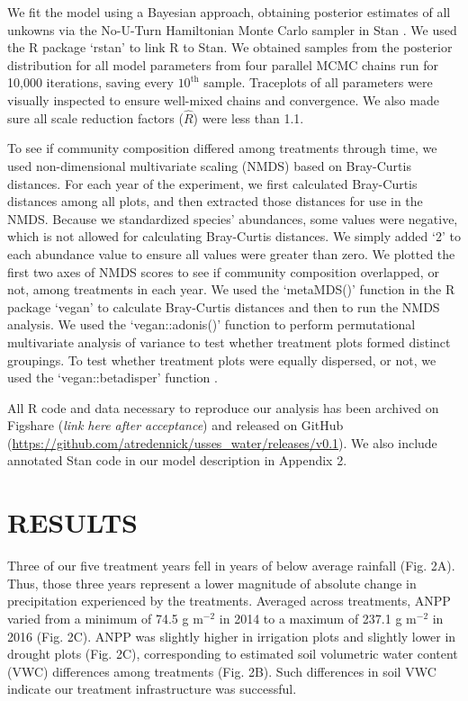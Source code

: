 \documentclass[fleqn,10pt,lineno]{wlpeerj} %
\begin{document}
We fit the model using a Bayesian approach, obtaining posterior
estimates of all unkowns via the No-U-Turn Hamiltonian Monte Carlo
sampler in Stan \citep{stan2016}. We used the R package `rstan'
\citep{rstan2016} to link R \citep{R2016} to Stan. We obtained samples
from the posterior distribution for all model parameters from four
parallel MCMC chains run for 10,000 iterations, saving every
\(10^{\text{th}}\) sample. Traceplots of all parameters were visually
inspected to ensure well-mixed chains and convergence. We also made sure
all scale reduction factors (\(\hat{R}\)) were less than 1.1.

To see if community composition differed among treatments through time,
we used non-dimensional multivariate scaling (NMDS) based on Bray-Curtis
distances. For each year of the experiment, we first calculated
Bray-Curtis distances among all plots, and then extracted those
distances for use in the NMDS. Because we standardized species'
abundances, some values were negative, which is not allowed for
calculating Bray-Curtis distances. We simply added `2' to each abundance
value to ensure all values were greater than zero. We plotted the first
two axes of NMDS scores to see if community composition overlapped, or
not, among treatments in each year. We used the `metaMDS()' function in
the R package `vegan' \citep{Oksanen2016} to calculate Bray-Curtis
distances and then to run the NMDS analysis. We used the
`vegan::adonis()' function \citep{Oksanen2016} to perform permutational
multivariate analysis of variance to test whether treatment plots formed
distinct groupings. To test whether treatment plots were equally
dispersed, or not, we used the `vegan::betadisper' function
\citep{Oksanen2016}.

All R code and data necessary to reproduce our analysis has been
archived on Figshare (\emph{link here after acceptance}) and released on
GitHub (\url{https://github.com/atredennick/usses_water/releases/v0.1}).
We also include annotated Stan code in our model description in Appendix
2.

\section{RESULTS}\label{results}

Three of our five treatment years fell in years of below average
rainfall (Fig. 2A). Thus, those three years represent a lower magnitude
of absolute change in precipitation experienced by the treatments.
Averaged across treatments, ANPP varied from a minimum of 74.5 g
m\(^{-2}\) in 2014 to a maximum of 237.1 g m\(^{-2}\) in 2016 (Fig. 2C).
ANPP was slightly higher in irrigation plots and slightly lower in
drought plots (Fig. 2C), corresponding to estimated soil volumetric
water content (VWC) differences among treatments (Fig. 2B). Such
differences in soil VWC indicate our treatment infrastructure was
successful.
\end{document}

